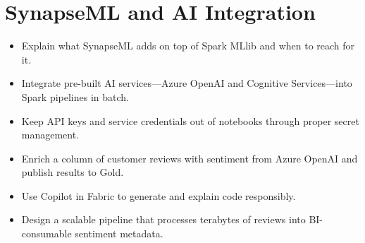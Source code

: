 \chapter{SynapseML and AI Integration}
%

\begin{objectives}
\begin{itemize}
    \item Explain what SynapseML adds on top of Spark MLlib and when to reach for it.
    \item Integrate pre-built AI services---Azure OpenAI and Cognitive Services---into Spark pipelines in batch.
    \item Keep API keys and service credentials out of notebooks through proper secret management.
    \item Enrich a column of customer reviews with sentiment from Azure OpenAI and publish results to Gold.
    \item Use Copilot in Fabric to generate and explain code responsibly.
    \item Design a scalable pipeline that processes terabytes of reviews into BI-consumable sentiment metadata.
\end{itemize}
\end{objectives}

